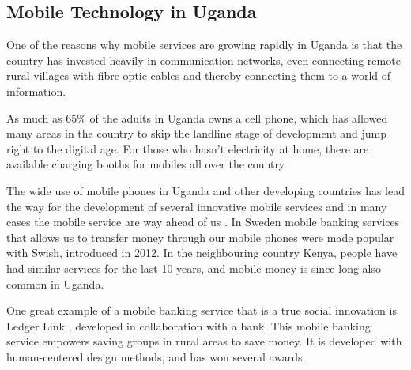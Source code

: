 \subsection{Mobile Technology in Uganda}\label{sec:mobile-uganda}

One of the reasons why mobile services are growing rapidly in Uganda is that the country has invested heavily in communication networks, even connecting remote rural villages with fibre optic cables and thereby connecting them to a world of information.

As much as 65\% of the adults in Uganda owns a cell phone, which has allowed many areas in the country to skip the landline stage of development and jump right to the digital age. For those who hasn’t electricity at home, there are available charging booths for mobiles all over the country.

The wide use of mobile phones in Uganda and other developing countries has lead the way for the development of several innovative mobile services and in many cases the mobile service are way ahead of us  \citep{nissar}. In Sweden mobile banking services that allows us to transfer money through our mobile phones were made popular with Swish, introduced in 2012. In the neighbouring country Kenya, people have had similar services for the last 10 years, and mobile money is since long also common in Uganda.

One great example of a mobile banking service that is a true social innovation is Ledger Link \citep{ledgerlink}, developed in collaboration with a bank. This mobile banking service empowers saving groups in rural areas to save money. It is developed with human-centered design methods, and has won several awards.




%
